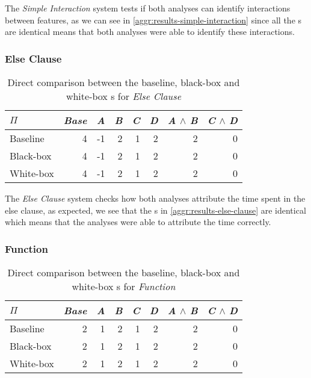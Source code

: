 The \emph{Simple Interaction} system tests if both analyses can identify interactions between features, 
as we can see in \autoref{aggr:results-simple-interaction} since all the {\perfInfluenceModel}s are identical means 
that both analyses were able to identify these interactions.

\subsubsection*{Else Clause}

\begin{table}[H]
    \centering
    \begin{tabular}{lrrrrrrr}
    \toprule
    $\Pi$    & \emph{Base} & \emph{A} & \emph{B} & \emph{C} & \emph{D} & \emph{A} $\land$ \emph{B} & \emph{C} $\land$ \emph{D}  \\ \midrule
    Baseline & 4    & -1 & 2 & 1 & 2 & 2           & 0            \\
    Black-box & 4    & -1 & 2 & 1 & 2 & 2           & 0           \\
    White-box & 4    & -1 & 2 & 1 & 2 & 2           & 0           \\ \bottomrule
    \end{tabular}  
    \caption{Direct comparison between the baseline, black-box and white-box {\perfInfluenceModel}s for \emph{Else Clause}}\label{aggr:results-else-clause}
\end{table}

The \emph{Else Clause} system checks how both analyses attribute the time spent in the else clause, as expected, we see that the {\perfInfluenceModel}s in
\autoref{aggr:results-else-clause} are identical which means that the analyses were able to attribute the time correctly.

\subsubsection*{Function}

\begin{table}[H]
    \centering
    \begin{tabular}{lrrrrrrr}
    \toprule
    $\Pi$    & \emph{Base} & \emph{A} & \emph{B} & \emph{C} & \emph{D} & \emph{A} $\land$ \emph{B} & \emph{C} $\land$ \emph{D}  \\ \midrule
    Baseline & 2    & 1 & 2 & 1 & 2 & 2           & 0            \\
    Black-box & 2   & 1 & 2 & 1 & 2 & 2           & 0            \\
    White-box & 2   & 1 & 2 & 1 & 2 & 2           & 0            \\ \bottomrule
    \end{tabular}  
    \caption{Direct comparison between the baseline, black-box and white-box {\perfInfluenceModel}s for \emph{Function}}\label{aggr:results-function}
\end{table}


